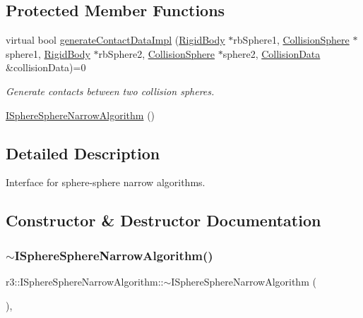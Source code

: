 \subsection*{Protected Member Functions}
\begin{DoxyCompactItemize}
\item 
virtual bool \mbox{\hyperlink{classr3_1_1_i_sphere_sphere_narrow_algorithm_a9e616d04c7ee379d973ec81ea0067cc3}{generate\+Contact\+Data\+Impl}} (\mbox{\hyperlink{classr3_1_1_rigid_body}{Rigid\+Body}} $\ast$rb\+Sphere1, \mbox{\hyperlink{classr3_1_1_collision_sphere}{Collision\+Sphere}} $\ast$sphere1, \mbox{\hyperlink{classr3_1_1_rigid_body}{Rigid\+Body}} $\ast$rb\+Sphere2, \mbox{\hyperlink{classr3_1_1_collision_sphere}{Collision\+Sphere}} $\ast$sphere2, \mbox{\hyperlink{classr3_1_1_collision_data}{Collision\+Data}} \&collision\+Data)=0
\begin{DoxyCompactList}\small\item\em Generate contacts between two collision spheres. \end{DoxyCompactList}\item 
\mbox{\hyperlink{classr3_1_1_i_sphere_sphere_narrow_algorithm_ac7efae14951096a647a7d037f275d75b}{I\+Sphere\+Sphere\+Narrow\+Algorithm}} ()
\end{DoxyCompactItemize}


\subsection{Detailed Description}
Interface for sphere-\/sphere narrow algorithms. 

\subsection{Constructor \& Destructor Documentation}
\mbox{\label{classr3_1_1_i_sphere_sphere_narrow_algorithm_af1abc65f80b07e3af1d3b1c69d6b5db0}} 
\subsubsection{\texorpdfstring{$\sim$\+I\+Sphere\+Sphere\+Narrow\+Algorithm()}{~ISphereSphereNarrowAlgorithm()}}
{\footnotesize\ttfamily r3\+::\+I\+Sphere\+Sphere\+Narrow\+Algorithm\+::$\sim$\+I\+Sphere\+Sphere\+Narrow\+Algorithm (\begin{DoxyParamCaption}{ }\end{DoxyParamCaption})\hspace{0.3cm}{\ttfamily [virtual]}, {\ttfamily [default]}}

